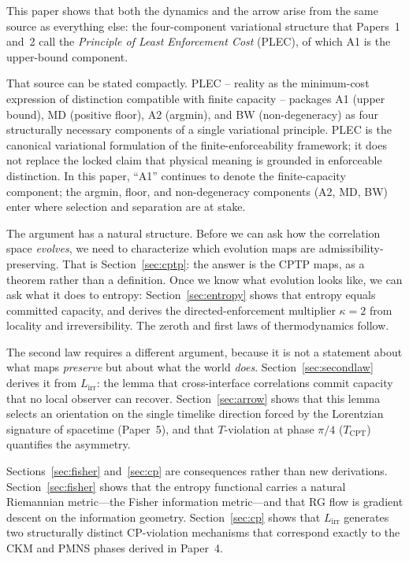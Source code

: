 \documentclass[11pt]{article}
\begin{document}
This paper shows that both the dynamics and the arrow arise from the same
source as everything else: the four-component variational structure that
Papers~1 and~2 call the \emph{Principle of Least Enforcement Cost} (PLEC),
of which A1 is the upper-bound component.

That source can be stated compactly.  PLEC -- reality as the minimum-cost
expression of distinction compatible with finite capacity -- packages
A1 (upper bound), MD (positive floor), A2 (argmin), and BW (non-degeneracy)
as four structurally necessary components of a single variational
principle.  PLEC is the canonical variational formulation of
the finite-enforceability framework; it does not replace the locked claim
that physical meaning is grounded in enforceable distinction.  In this
paper, ``A1'' continues to denote the finite-capacity component; the
argmin, floor, and non-degeneracy components (A2, MD, BW) enter where
selection and separation are at stake.

The argument has a natural structure.  Before we can ask how the correlation
space \emph{evolves}, we need to characterize which evolution maps are
admissibility-preserving.  That is Section~\ref{sec:cptp}: the answer is the
CPTP maps, as a theorem rather than a definition.  Once we know what
evolution looks like, we can ask what it does to entropy: Section~\ref{sec:entropy}
shows that entropy equals committed capacity, and derives the
directed-enforcement multiplier $\kappa=2$ from locality and irreversibility.
The zeroth and first laws of thermodynamics follow.

The second law requires a different argument, because it is not a statement
about what maps \emph{preserve} but about what the world \emph{does}.
Section~\ref{sec:secondlaw} derives it from $L_{\mathrm{irr}}$: the lemma
that cross-interface correlations commit capacity that no local observer can
recover.  Section~\ref{sec:arrow} shows that this lemma selects an
orientation on the single timelike direction forced by the Lorentzian
signature of spacetime (Paper~5), and that $T$-violation at phase $\pi/4$
($T_{\mathrm{CPT}}$) quantifies the asymmetry.

Sections~\ref{sec:fisher} and~\ref{sec:cp} are consequences rather than new
derivations.  Section~\ref{sec:fisher} shows that the entropy functional
carries a natural Riemannian metric---the Fisher information metric---and
that RG flow is gradient descent on the information geometry.  Section~\ref{sec:cp}
shows that $L_{\mathrm{irr}}$ generates two structurally distinct CP-violation
mechanisms that correspond exactly to the CKM and PMNS phases derived in
Paper~4.
\end{document}
